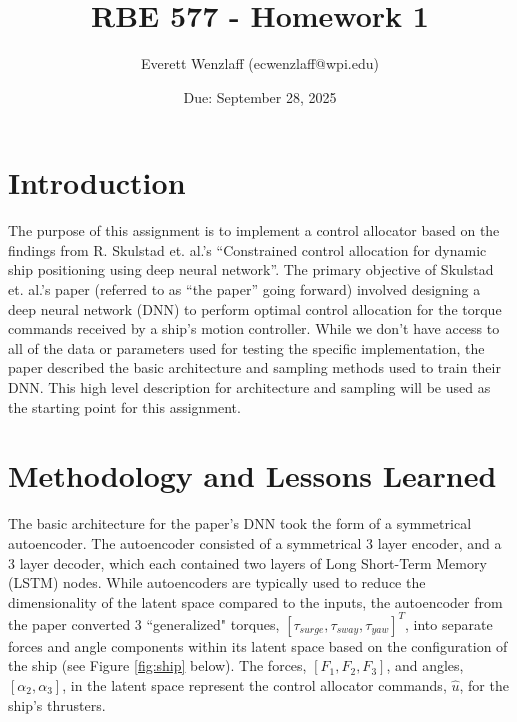 \documentclass{article}
\title{RBE 577 - Homework 1}
\author{Everett Wenzlaff (ecwenzlaff@wpi.edu)}
\date{Due: September 28, 2025}
\begin{document}
\maketitle

\section{Introduction}
The purpose of this assignment is to implement a control allocator based on the findings from R. Skulstad et. al.'s ``Constrained control allocation for dynamic ship positioning using deep neural network''\cite{paper}. The primary objective of Skulstad et. al.'s paper (referred to as ``the paper'' going forward) involved designing a deep neural network (DNN) to perform optimal control allocation for the torque commands received by a ship's motion controller. While we don't have access to all of the data or parameters used for testing the specific implementation, the paper described the basic architecture and sampling methods used to train their DNN. This high level description for architecture and sampling will be used as the starting point for this assignment.

\section{Methodology and Lessons Learned}
The basic architecture for the paper's DNN took the form of a symmetrical autoencoder. The autoencoder consisted of a symmetrical 3 layer encoder, and a 3 layer decoder, which each contained two layers of Long Short-Term Memory (LSTM) nodes. While autoencoders are typically used to reduce the dimensionality of the latent space compared to the inputs, the autoencoder from the paper converted 3 ``generalized" torques, $\left[\tau_{surge}, \tau_{sway}, \tau_{yaw}\right]^{T}$, into separate forces and angle components within its latent space based on the configuration of the ship (see Figure \ref{fig:ship} below). The forces, $\left[F_1, F_2, F_3\right]$, and angles, $\left[\alpha_2, \alpha_3\right]$, in the latent space represent the control allocator commands, $\hat{u}$, for the ship's thrusters.
\end{document}
